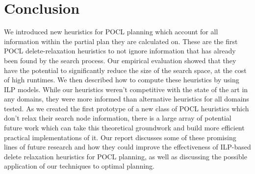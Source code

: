 \chapter{Conclusion}\label{chap:conclusion}

We introduced new heuristics for POCL planning which account for all information within the partial plan they are calculated on. These are the first POCL delete-relaxation heuristics to not ignore information that has already been found by the search process. Our empirical evaluation showed that they have the potential to significantly reduce the size of the search space, at the cost of high runtimes. We then described how to compute these heuristics by using ILP models. While our heuristics weren't competitive with the state of the art in any domains, they were more informed than alternative heuristics for all domains tested. As we created the first prototype of a new class of POCL heuristics which don't relax their search node information, there is a large array of potential future work which can take this theoretical groundwork and build more efficient practical implementations of it. Our report discusses some of these promising lines of future research and how they could improve the effectiveness of ILP-based delete relaxation heuristics for POCL planning, as well as discussing the possible application of our techniques to optimal planning.